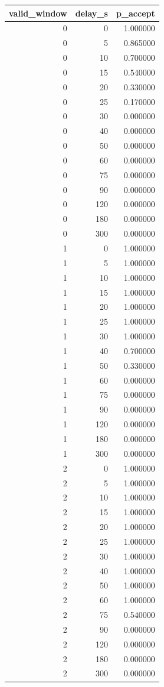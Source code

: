 \begin{tabular}{rrr}
\toprule
valid\_window & delay\_s & p\_accept \\
\midrule
0 & 0 & 1.000000 \\
0 & 5 & 0.865000 \\
0 & 10 & 0.700000 \\
0 & 15 & 0.540000 \\
0 & 20 & 0.330000 \\
0 & 25 & 0.170000 \\
0 & 30 & 0.000000 \\
0 & 40 & 0.000000 \\
0 & 50 & 0.000000 \\
0 & 60 & 0.000000 \\
0 & 75 & 0.000000 \\
0 & 90 & 0.000000 \\
0 & 120 & 0.000000 \\
0 & 180 & 0.000000 \\
0 & 300 & 0.000000 \\
1 & 0 & 1.000000 \\
1 & 5 & 1.000000 \\
1 & 10 & 1.000000 \\
1 & 15 & 1.000000 \\
1 & 20 & 1.000000 \\
1 & 25 & 1.000000 \\
1 & 30 & 1.000000 \\
1 & 40 & 0.700000 \\
1 & 50 & 0.330000 \\
1 & 60 & 0.000000 \\
1 & 75 & 0.000000 \\
1 & 90 & 0.000000 \\
1 & 120 & 0.000000 \\
1 & 180 & 0.000000 \\
1 & 300 & 0.000000 \\
2 & 0 & 1.000000 \\
2 & 5 & 1.000000 \\
2 & 10 & 1.000000 \\
2 & 15 & 1.000000 \\
2 & 20 & 1.000000 \\
2 & 25 & 1.000000 \\
2 & 30 & 1.000000 \\
2 & 40 & 1.000000 \\
2 & 50 & 1.000000 \\
2 & 60 & 1.000000 \\
2 & 75 & 0.540000 \\
2 & 90 & 0.000000 \\
2 & 120 & 0.000000 \\
2 & 180 & 0.000000 \\
2 & 300 & 0.000000 \\
\bottomrule
\end{tabular}
